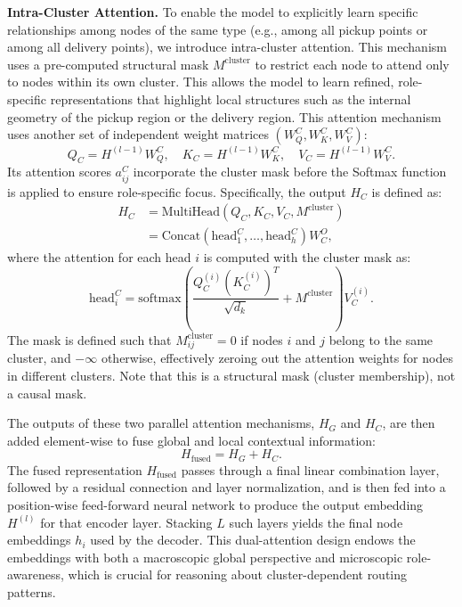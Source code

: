 \documentclass[pdflatex,sn-basic,Numbered]{sn-jnl}
\begin{document}
\textbf{Intra-Cluster Attention.} To enable the model to explicitly learn specific relationships among nodes of the same type (e.g., among all pickup points or among all delivery points), we introduce intra-cluster attention. This mechanism uses a pre-computed structural mask $M^{\text{cluster}}$ to restrict each node to attend only to nodes within its own cluster. This allows the model to learn refined, role-specific representations that highlight local structures such as the internal geometry of the pickup region or the delivery region. This attention mechanism uses another set of independent weight matrices $(W_Q^C, W_K^C, W_V^C)$:
\begin{equation}
    Q_C = H^{(l-1)}W_Q^C, \quad K_C = H^{(l-1)}W_K^C, \quad V_C = H^{(l-1)}W_V^C.
\end{equation}
Its attention scores $a_{ij}^C$ incorporate the cluster mask before the Softmax function is applied to ensure role-specific focus. Specifically, the output $H_C$ is defined as:
\begin{equation}
\begin{split}
    H_C &= \text{MultiHead}(Q_C, K_C, V_C, M^{\text{cluster}}) \\
        &= \text{Concat}(\text{head}_1^C, \dots, \text{head}_h^C)W^O_C,
\end{split}
\end{equation}
where the attention for each head $i$ is computed with the cluster mask as:
\begin{equation}
    \text{head}_i^C = \text{softmax} \left( \frac{Q_C^{(i)} (K_C^{(i)})^T}{\sqrt{d_k}} + M^{\text{cluster}} \right) V_C^{(i)}.
\end{equation}
The mask is defined such that $M^{\text{cluster}}_{ij} = 0$ if nodes $i$ and $j$ belong to the same cluster, and $-\infty$ otherwise, effectively zeroing out the attention weights for nodes in different clusters. Note that this is a structural mask (cluster membership), not a causal mask.

The outputs of these two parallel attention mechanisms, $H_G$ and $H_C$, are then added element-wise to fuse global and local contextual information:
\begin{equation}
    H_{\text{fused}} = H_G + H_C.
\end{equation}
The fused representation $H_{\text{fused}}$ passes through a final linear combination layer, followed by a residual connection and layer normalization, and is then fed into a position-wise feed-forward neural network to produce the output embedding $H^{(l)}$ for that encoder layer. Stacking $L$ such layers yields the final node embeddings $h_i$ used by the decoder. This dual-attention design endows the embeddings with both a macroscopic global perspective and microscopic role-awareness, which is crucial for reasoning about cluster-dependent routing patterns.
\end{document}
